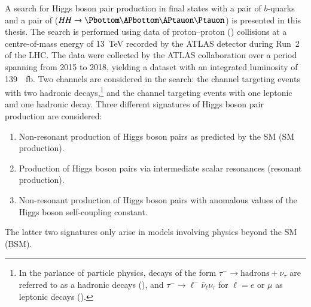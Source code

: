A search for Higgs boson pair production in final states with a pair of
$b$-quarks and a pair of \tauleptons ($HH \to \bbtautau$) is presented in this
thesis. The search is performed using data of proton--proton (\pp) collisions at
a centre-of-mass energy of \SI{13}{\TeV} recorded by the ATLAS detector during
Run~2 of the LHC. The data were collected by the ATLAS collaboration over a
period spanning from 2015 to 2018, yielding a dataset with an integrated
luminosity of \SI{139}{\per\femto\barn}. Two channels are considered in the
search: the \hadhad channel targeting events with two hadronic \taulepton
decays,\footnote{In the parlance of particle physics, decays of the form
  $\tau^- \to \text{hadrons} + \nu_\tau$ are referred to as a hadronic
  \taulepton decays (\tauhad), and $\tau^- \to \ell^- \bar{\nu}_\ell \nu_\tau$
  for $\ell = e$ or $\mu$ as leptonic \taulepton decays (\taulep).} and the
\lephad channel targeting events with one leptonic and one hadronic \taulepton
decay. Three different signatures of Higgs boson pair production are considered:
\begin{enumerate}

\item Non-resonant production of Higgs boson pairs as predicted by the SM (SM
  \HH production).

\item Production of Higgs boson pairs via intermediate scalar resonances
  (resonant \HH production).

\item Non-resonant production of Higgs boson pairs with anomalous values of the
  Higgs boson self-coupling constant.

\end{enumerate}
The latter two signatures only arise in models involving physics beyond the SM
(BSM).










